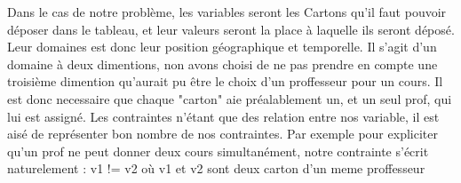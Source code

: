 Dans le cas de notre problème, les variables seront les Cartons qu'il faut pouvoir déposer dans le tableau, et leur valeurs seront la place à laquelle ils seront déposé. Leur domaines est donc leur position géographique et temporelle. Il s'agit d'un domaine à deux dimentions, non avons choisi de ne pas prendre en compte une troisième dimention qu'aurait pu être le choix d'un proffesseur pour un cours. Il est donc necessaire que chaque "carton" aie préalablement un, et un seul prof, qui lui est assigné.
Les contraintes n'étant que des relation entre nos variable, il est aisé de représenter bon nombre de nos contraintes. Par exemple pour expliciter qu'un prof ne peut donner deux cours simultanément, notre contrainte s'écrit naturelement :
v1 != v2 où v1 et v2 sont deux carton d'un meme proffesseur
% 
% 
